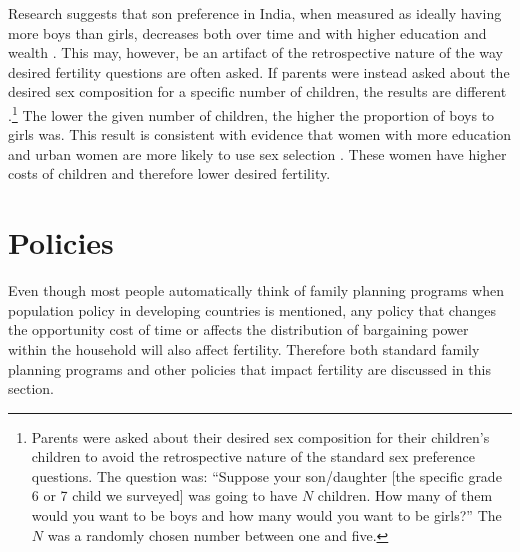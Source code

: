 Research suggests that son preference in India, when measured as ideally having more boys than girls, decreases both over time and with higher education and wealth \citep{bhat03,pande07,Gaudin2011}. This may, however, be an artifact of the retrospective nature of the way desired fertility questions are often asked. If parents were instead asked about the desired sex composition for a specific number of children, the results are different \citep{Jayachandran2017}.\footnote{Parents were asked about their desired sex composition for their children's children to avoid the retrospective nature of the standard sex preference questions. The question was: ``Suppose your son/daughter {[}the specific grade 6 or 7 child we surveyed{]} was going to have \(N\) children. How many of them would you want to be boys and how many would you want to be girls?'' The \(N\) was a randomly chosen number between one and five.} The lower the given number of children, the higher the proportion of boys to girls was. This result is consistent with evidence that women with more education and urban women are more likely to use sex selection \citep{Portner2015b}. These women have higher costs of children and therefore lower desired fertility.

\section{Policies}\label{policies}

Even though most people automatically think of family planning programs when population policy in developing countries is mentioned, any policy that changes the opportunity cost of time or affects the distribution of bargaining power within the household will also affect fertility. Therefore both standard family planning programs and other policies that impact fertility are discussed in this section.

